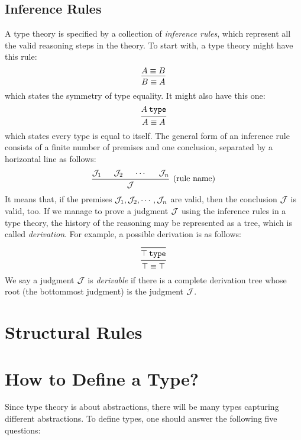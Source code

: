 \documentclass[11pt]{article}
\begin{document}
\subsection{Inference Rules}

A type theory is specified by a collection of \emph{inference rules},
which represent all the valid reasoning steps in the theory.
To start with, a type theory might have this rule:
\[
  \begin{prooftree}
    \hypo{\eqtype{A}{B}}
    \infer1{\eqtype{B}{A}}
  \end{prooftree}
\]
which states the symmetry of type equality.
It might also have this one:
\[
  \begin{prooftree}
    \hypo{\istype{A}}
    \infer1{\eqtype{A}{A}}
  \end{prooftree}
\]
which states every type is equal to itself.
The general form of an inference rule consists of a finite number of premises and one conclusion,
separated by a horizontal line as follows:
\[
  \begin{prooftree}
    \hypo{\JJ_1}
    \hypo{\JJ_2}
    \hypo{\cdots}
    \hypo{\JJ_n}
    \infer4[(rule name)]{\JJ}
  \end{prooftree}
\]
It means that, if the premises $\mathcal{J}_1, \mathcal{J}_2, \cdots, \mathcal{J}_n$ are valid, then the conclusion $\mathcal{J}$ is valid, too.
If we manage to prove a judgment $\mathcal{J}$ using the inference rules in a type theory,
the history of the reasoning may be represented as a tree, which is called \emph{derivation}.
For example, a possible derivation is as follows:
\[
  \begin{prooftree}
    \infer0{\istype{\unittype}}
    \infer1{\eqtype{\unittype}{\unittype}}
  \end{prooftree}
\]
We say a judgment $\mathcal{J}$ is \emph{derivable} if there is a complete derivation tree whose root (the bottommost judgment) is the judgment $\mathcal{J}$.

\section{Structural Rules}

\section{How to Define a Type?}

Since type theory is about abstractions, there will be many types capturing different abstractions. To define types, one should answer the following five questions:
\end{document}
